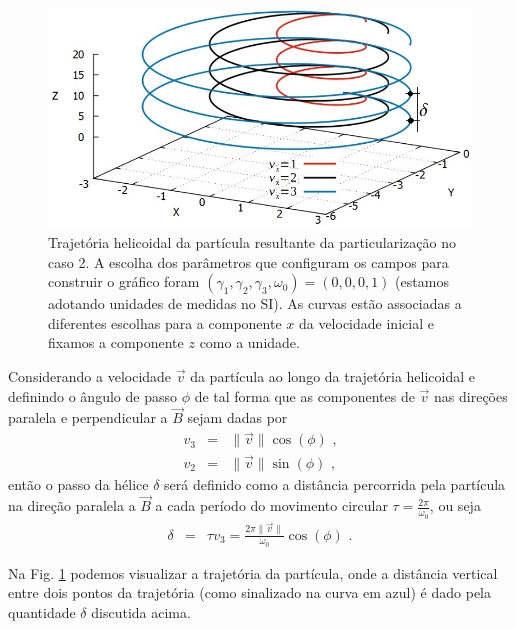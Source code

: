 \documentclass[twocolumn]{rbef}
\newcommand{\1}{\mathbbm{1}}
\begin{document}
\begin{figure}[!htb]
  \centering \includegraphics[scale=0.38]{Helicoidal.jpg}
  \caption{Trajetória helicoidal da partícula resultante da
    particularização no caso 2. A escolha dos parâmetros que configuram
    os campos para construir o gráfico foram
    $(\gamma_1,\gamma_2,\gamma_3,\omega_0)=(0,0,0,1)$ (estamos adotando
    unidades de medidas no SI). As curvas estão associadas a diferentes
    escolhas para a componente $x$ da velocidade inicial e fixamos a
    componente $z$ como a unidade.}
  \label{helicoidal}
\end{figure}

Considerando a velocidade $\vec{v}$ da partícula ao longo da trajetória
helicoidal e definindo o ângulo de passo $\phi$ de tal forma que as
componentes de $\vec{v}$ nas direções paralela e perpendicular a
$\vec{B}$ sejam dadas por
\begin{eqnarray}
  v_{3} &=& \|\vec{v}\| \cos \left(\phi\right) \text{ ,} \label{AP1} \\
  v_{2} &=& \|\vec{v}\| \sin \left(\phi\right)  \text{ ,} \label{AP2}
\end{eqnarray}%
então o passo da hélice $\delta$ será definido como a distância
percorrida pela partícula na direção paralela a $\vec{B}$ a cada período
do movimento circular $\tau = \frac{2\pi}{\omega_{0}}$, ou seja
\begin{eqnarray}
  \delta &=& \tau v_{3} = \frac{2 \pi \|\vec{v}\|}{\omega_{0}}  \cos \left(\phi\right) \text{ .} \label{PS1}
\end{eqnarray}%

Na Fig. \ref{helicoidal} podemos visualizar a trajetória da partícula,
onde a distância vertical entre dois pontos da trajetória (como
sinalizado na curva em azul) é dado pela quantidade $\delta$ discutida
acima.
\end{document}
